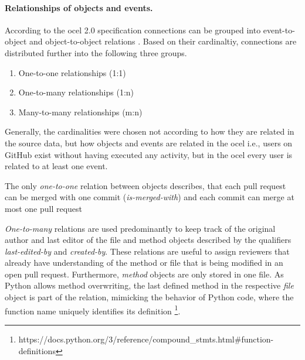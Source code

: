 \paragraph{Relationships of objects and events.} According to the  \ac{ocel} 2.0 specification connections can be grouped into event-to-object and object-to-object relations \cite{DBLP:journals/corr/abs-2403-01975}. Based on their cardinaltiy, connections are distributed further into the following three groups.

\begin{enumerate}
	\item One-to-one relationships (1:1)
	\item One-to-many relationships (1:n)
	\item Many-to-many relationships (m:n)
\end{enumerate}

Generally, the cardinalities were chosen not according to how they are related in the source data, but how objects and events are related in the \ac{ocel} i.e., users on GitHub exist without having executed any activity, but in the \ac{ocel} every user is related to at least one event.

The only \emph{one-to-one} relation between objects describes, that each pull request can be merged with one commit (\emph{is-merged-with}) and each commit can merge at most one pull request

\emph{One-to-many} relations are used predominantly to keep track of the original author and last editor of the file and method objects described by the qualifiers \emph{last-edited-by} and \emph{created-by}. These relations are useful to assign reviewers that already have understanding of the method or file that is being modified in an open pull request.
Furthermore, \emph{method} objects are only stored in one file. As Python allows method overwriting, the last defined method in the respective \emph{file} object is part of the relation, mimicking the behavior of Python code, where the function name uniquely identifies its definition \footnote{https://docs.python.org/3/reference/compound\_stmts.html\#function-definitions}.


